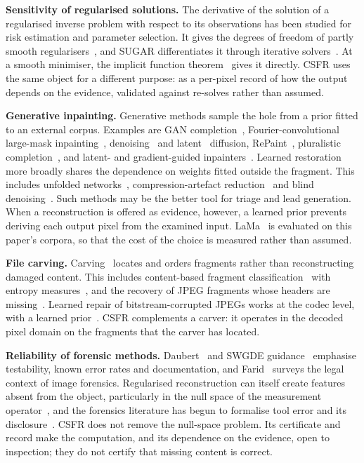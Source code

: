 \documentclass[final,3p]{elsarticle}
\begin{document}
\textbf{Sensitivity of regularised solutions.} The derivative of the solution of a regularised inverse problem with respect to its observations has been studied for risk estimation and parameter selection. It gives the degrees of freedom of partly smooth regularisers~\cite{vaiter2017degrees}, and SUGAR differentiates it through iterative solvers~\cite{deledalle2014stein}. At a smooth minimiser, the implicit function theorem~\cite{dontchev2014implicit} gives it directly. CSFR uses the same object for a different purpose: as a per-pixel record of how the output depends on the evidence, validated against re-solves rather than assumed.

\textbf{Generative inpainting.} Generative methods sample the hole from a prior fitted to an external corpus. Examples are GAN completion~\cite{yu2018generative}, Fourier-convolutional large-mask inpainting~\cite{suvorov2022resolution}, denoising~\cite{ho2020denoising} and latent~\cite{rombach2022high} diffusion, RePaint~\cite{lugmayr2022repaint}, pluralistic completion~\cite{zheng2019pluralistic}, and latent- and gradient-guided inpainters~\cite{corneanu2024latentpaint,grechka2024gradpaint}. Learned restoration more broadly shares the dependence on weights fitted outside the fragment. This includes unfolded networks~\cite{le2024unfolded,mou2022deep}, compression-artefact reduction~\cite{ma2024sensitivity} and blind denoising~\cite{zhang2024scalable}. Such methods may be the better tool for triage and lead generation. When a reconstruction is offered as evidence, however, a learned prior prevents deriving each output pixel from the examined input. LaMa~\cite{suvorov2022resolution} is evaluated on this paper's corpora, so that the cost of the choice is measured rather than assumed.

\textbf{File carving.} Carving~\cite{garfinkel2007carving,pal2009evolution,poisel2013advanced,mikus2005evaluation} locates and orders fragments rather than reconstructing damaged content. This includes content-based fragment classification~\cite{calhoun2008sceadan} with entropy measures~\cite{shannon1948entropy}, and the recovery of JPEG fragments whose headers are missing~\cite{uzun2015carving}. Learned repair of bitstream-corrupted JPEGs works at the codec level, with a learned prior~\cite{liu2023bitstream}. CSFR complements a carver: it operates in the decoded pixel domain on the fragments that the carver has located.

\textbf{Reliability of forensic methods.} Daubert~\cite{daubert1993} and SWGDE guidance~\cite{swgde2023} emphasise testability, known error rates and documentation, and Farid~\cite{farid2009digital} surveys the legal context of image forensics. Regularised reconstruction can itself create features absent from the object, particularly in the null space of the measurement operator~\cite{bhadra2021hallucinations,tivnan2024hallucination}, and the forensics literature has begun to formalise tool error and its disclosure~\cite{horsman2024sources,arslan2024reliability}. CSFR does not remove the null-space problem. Its certificate and record make the computation, and its dependence on the evidence, open to inspection; they do not certify that missing content is correct.
\end{document}
